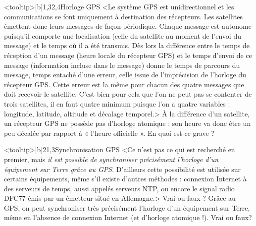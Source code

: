 \begin{quiz}[title={Localisation, cartographie et mobilité}]
\begin{quizquestion}<tooltip>[b]{1,3}{2,4}{Horloge GPS}
<Le système GPS est unidirectionnel et les communications se font uniquement à destination des récepteurs. Les satellites émettent donc leurs messages de façon périodique.
Chaque message est autonome puisqu’il comporte une localisation (celle du satellite au moment de l’envoi du message) et le temps où il a été transmis.
Dès lors la différence entre le temps de réception d’un message (heure locale du récepteur GPS) et le temps d’envoi de ce message (information incluse dans le message) donne le temps de parcours du message, temps entaché d’une erreur, celle issue de l’imprécision de l’horloge du récepteur GPS.
Cette erreur est la même pour chacun des quatre messages que doit recevoir le satellite.
C’est bien pour cela que l’on ne peut pas se contenter de trois satellites, il en faut quatre minimum puisque l’on a quatre variables : longitude, latitude, altitude et décalage temporel.>
À la différence d’un satellite, un récepteur GPS ne possède pas d’horloge atomique : son heure va donc être un peu décalée par rapport à « l'heure officielle ». En quoi est-ce grave ?
\end{quizquestion}

\begin{quizquestion*}<tooltip>[b]{2}{1,3}{Synchronisation GPS}
<Ce n’est pas ce qui est recherché en premier, mais \emph{il est possible de synchroniser précisément l'horloge d'un équipement sur Terre grâce au GPS}. D’ailleurs cette possibilité est utilisée sur certains équipements, même s’il existe d’autres méthodes : connexion Internet à des serveurs de temps, aussi appelés serveurs NTP, ou encore le signal radio DFC77 émis par un émetteur situé en Allemagne.>
Vrai ou faux ? Grâce au GPS, on peut synchroniser très précisément l’horloge d'un équipement sur Terre, même en l’absence de connexion Internet (et d’horloge atomique !).
Vrai ou faux? 
\end{quizquestion*}


\end{quiz}
